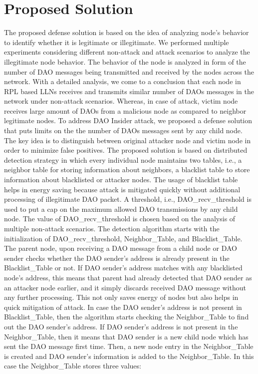 \documentclass[conference, a4paper]{IEEEtran}
\begin{document}
\section{Proposed Solution}\label{Sec:proposed solution}
The proposed defense solution is based on the idea of analyzing node's behavior to identify whether it is legitimate or illegitimate. We performed multiple experiments considering different non-attack and attack scenarios to analyze the illegitimate node behavior. The behavior of the node is analyzed in form of the number of DAO messages being transmitted and received by the nodes across the network. With a detailed analysis, we come to a conclusion that each node in RPL based LLNs receives and transmits similar number of DAOs messages in the network under non-attack scenarios. Whereas, in case of attack, victim node receives large amount of DAOs from a malicious node as compared to neighbor legitimate nodes. To address DAO Insider attack, we proposed a defense solution that puts limits on the the number of DAOs messages sent by any child node. The key idea is to distinguish between original attacker node and victim node in order to minimize false positives. The proposed solution is based on distributed detection strategy in which every individual node maintains two tables, i.e., a neighbor table for storing information about neighbors, a blacklist table to store information about blacklisted or attacker nodes. The usage of blacklist table helps in energy saving because attack is mitigated quickly without additional processing of illegitimate DAO packet. A threshold, i.e., DAO\_recv\_threshold is used to put a cap on the maximum allowed DAO transmissions by any child node. The value of DAO\_recv\_threshold is chosen based on the analysis of multiple non-attack scenarios. The detection algorithm starts with the initialization of DAO\_recv\_threshold, Neighbor\_Table, and Blacklist\_Table. The parent node, upon receiving a DAO message from a child node or DAO sender checks whether the DAO sender's address is already present in the Blacklist\_Table or not. If DAO sender's address matches with any blacklisted node's address, this means that parent had already detected that DAO sender as an attacker node earlier, and it simply discards received DAO message without any further processing. This not only saves energy of nodes but also helps in quick mitigation of attack. In case the DAO sender's address is not present in Blacklist\_Table, then the algorithm starts checking the Neighbor\_Table to find out the DAO sender's address. If DAO sender's address is not present in the Neighbor\_Table, then it means that DAO sender is a new child node which has sent the DAO message first time. Then, a new node entry in the Neighbor\_Table is created and DAO sender's information is added to the Neighbor\_Table. In this case the Neighbor\_Table stores three values:
\end{document}
